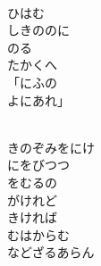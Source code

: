 \documentclass[10pt,b5j]{tarticle} %
\begin{document}
\begin{enumerate}
\begin{minipage}[c]{\blocksize}
    \end{minipage}
    \begin{minipage}[c]{\blocksize}
        
        \vspace{\linespace}
        \item~\\
        ひはむ\\
        しきののに\\
        のる\\
        たかくへ\\
        「にふの\\
        よにあれ」
        
    \end{minipage}
    \begin{minipage}[c]{\blocksize}
        
        \vspace{\linespace}
        \item~\\
        きのぞみをにけ\\
        にをびつつ\\
        をむるの\\
        がけれど\\
        きければ\\
        むはからむ\\
        などざるあらん
    
    \end{minipage}
\end{enumerate} %
\end{document}
